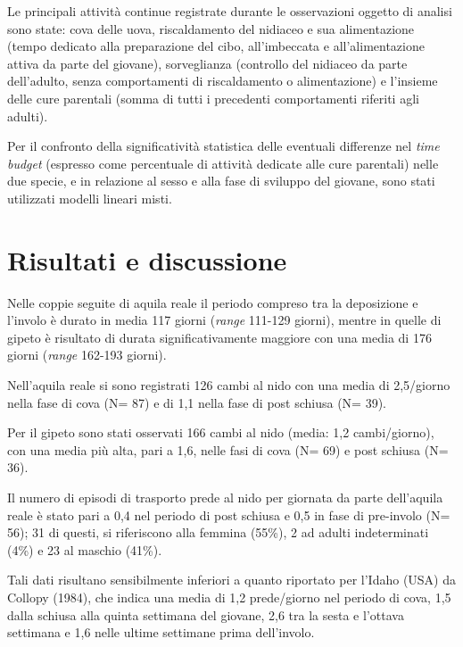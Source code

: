 Le principali attivit\`a continue registrate durante le osservazioni
oggetto di analisi sono state: cova delle uova, riscaldamento del
nidiaceo e sua alimentazione (tempo dedicato alla preparazione del
cibo, all{\textquoteright}imbeccata e all{\textquoteright}alimentazione
attiva da parte del giovane), sorveglianza (controllo del nidiaceo da
parte dell{\textquoteright}adulto, senza comportamenti di riscaldamento
o alimentazione) e l{\textquoteright}insieme delle cure parentali
(somma di tutti i precedenti comportamenti riferiti agli adulti).

Per il confronto della significativit\`a statistica delle eventuali
differenze nel \textit{time budget} (espresso come percentuale di
attivit\`a dedicate alle cure parentali) nelle due specie, e in
relazione al sesso e alla fase di sviluppo del giovane, sono stati
utilizzati modelli lineari misti. 

\section*{Risultati e discussione}

Nelle coppie seguite di aquila reale il periodo compreso tra la
deposizione e l{\textquoteright}involo \`e durato in media 117 giorni
(\textit{range} 111-129 giorni), mentre in quelle di gipeto \`e
risultato di durata significativamente maggiore con una media di 176
giorni (\textit{range} 162-193 giorni).

Nell{\textquoteright}aquila reale si sono registrati 126 cambi al nido
con una media di 2,5/giorno nella fase di cova (N= 87) e di 1,1 nella
fase di post schiusa (N= 39). 

Per il gipeto sono stati osservati 166 cambi al nido (media: 1,2
cambi/giorno), con una media pi\`u alta, pari a 1,6, nelle fasi di cova
(N= 69) e post schiusa (N= 36). 

Il numero di episodi di trasporto prede al nido per giornata da parte
dell{\textquoteright}aquila reale \`e stato pari a 0,4 nel periodo di
post schiusa e 0,5 in fase di pre-involo (N= 56); 31 di questi, si
riferiscono alla femmina (55\%), 2 ad adulti indeterminati (4\%) e 23
al maschio (41\%). 

Tali dati risultano sensibilmente inferiori a quanto riportato per
l{\textquoteright}Idaho (USA) da Collopy (1984), che indica una media
di 1,2 prede/giorno nel periodo di cova, 1,5 dalla schiusa alla quinta
settimana del giovane, 2,6 tra la sesta e l{\textquoteright}ottava
settimana e 1,6 nelle ultime settimane prima
dell{\textquoteright}involo. 


